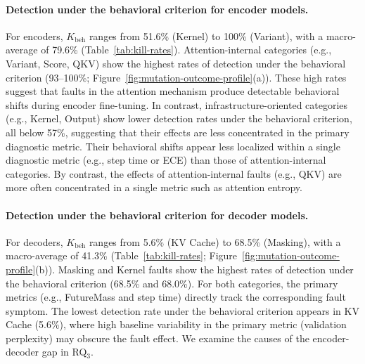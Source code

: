 \paragraph{Detection under the behavioral criterion for encoder models.}
For encoders, $K_{\text{beh}}$ ranges from 51.6\% (Kernel) to 100\% (Variant), with a macro-average of 79.6\% (Table~\ref{tab:kill-rates}). Attention-internal categories (e.g., Variant, Score, QKV) show the highest rates of detection under the behavioral criterion (93--100\%; Figure~\ref{fig:mutation-outcome-profile}(a)). These high rates suggest that faults in the attention mechanism produce detectable behavioral shifts during encoder fine-tuning. In contrast, infrastructure-oriented categories (e.g., Kernel, Output) show lower detection rates under the behavioral criterion, all below 57\%, suggesting that their effects are less concentrated in the primary diagnostic metric. Their behavioral shifts appear less localized within a single diagnostic metric (e.g., step time or ECE) than those of attention-internal categories. By contrast, the effects of attention-internal faults (e.g., QKV) are more often concentrated in a single metric such as attention entropy.

\paragraph{Detection under the behavioral criterion for decoder models.}
For decoders, $K_{\text{beh}}$ ranges from 5.6\% (KV Cache) to 68.5\% (Masking), with a macro-average of 41.3\% (Table~\ref{tab:kill-rates}; Figure~\ref{fig:mutation-outcome-profile}(b)). Masking and Kernel faults show the highest rates of detection under the behavioral criterion (68.5\% and 68.0\%). For both categories, the primary metrics (e.g., FutureMass and step time) directly track the corresponding fault symptom. The lowest detection rate under the behavioral criterion appears in KV Cache (5.6\%), where high baseline variability in the primary metric (validation perplexity) may obscure the fault effect. We examine the causes of the encoder-decoder gap in RQ$_3$.

